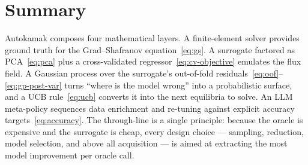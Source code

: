 \documentclass[11pt]{article}
\begin{document}
\section{Summary}

Autokamak composes four mathematical layers. A finite-element solver provides
ground truth for the Grad--Shafranov equation~\eqref{eq:gs}. A surrogate
factored as PCA~\eqref{eq:pca} plus a cross-validated
regressor~\eqref{eq:cv-objective} emulates the flux field. A Gaussian process
over the surrogate's out-of-fold residuals~\eqref{eq:oof}--\eqref{eq:gp-post-var}
turns ``where is the model wrong'' into a probabilistic surface, and a
UCB rule~\eqref{eq:ucb} converts it into the next equilibria to solve. An LLM
meta-policy sequences data enrichment and re-tuning against explicit accuracy
targets~\eqref{eq:accuracy}. The through-line is a single principle: because
the oracle is expensive and the surrogate is cheap, every design choice ---
sampling, reduction, model selection, and above all acquisition --- is aimed at
extracting the most model improvement per oracle call.
\end{document}
